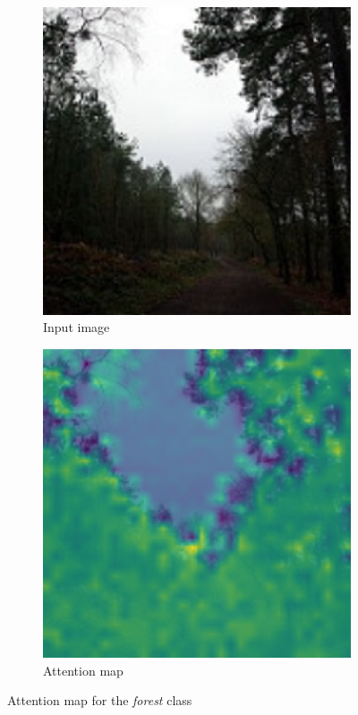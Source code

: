 \documentclass[twocolumn,superscriptaddress,aps]{revtex4-1}
\begin{document}
\begin{figure}[H]
    \centering
    \begin{subfigure}{0.235 \textwidth}
        \includegraphics[width=\textwidth]{images/img_attn_forest.png}
        \caption{Input image}
    \end{subfigure}
    \begin{subfigure}{0.235 \textwidth}
        \includegraphics[width=\textwidth]{images/map_attn_forest.png}
        \caption{Attention map}
    \end{subfigure}
    \caption{Attention map for the \textit{forest} class}
    \label{fig:attent_map2}
\end{figure}
\end{document}
